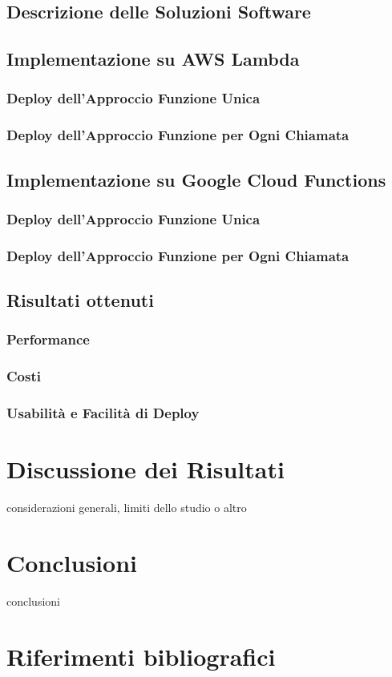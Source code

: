 \documentclass[12pt,a4paper,twoside]{book}
\begin{document}
\section{Descrizione delle Soluzioni Software}


\section{Implementazione su AWS Lambda}
\subsection{Deploy dell’Approccio Funzione Unica}


\subsection{Deploy dell’Approccio Funzione per Ogni Chiamata}


\section{Implementazione su Google Cloud Functions}
\subsection{Deploy dell’Approccio Funzione Unica}


\subsection{Deploy dell’Approccio Funzione per Ogni Chiamata}


\section{Risultati ottenuti}


\subsection{Performance}


\subsection{Costi}


\subsection{Usabilità e Facilità di Deploy}


\chapter{Discussione dei Risultati}
considerazioni generali, limiti dello studio o altro

\chapter{Conclusioni}
conclusioni

\renewcommand{\bibsection}{}
\chapter*{Riferimenti bibliografici}

\end{document}
